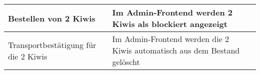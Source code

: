 \begin{table}[H]
\begin{small}
\begin{center}
\begin{tabularx}{\textwidth}{|X|X|L{1cm}|}
	Bestellen von 2 Kiwis &
	Im Admin-Frontend werden 2 Kiwis als blockiert angezeigt &
	\\ \hline
	
	Transportbestätigung für die 2 Kiwis &
	Im Admin-Frontend werden die 2 Kiwis automatisch aus dem Bestand gelöscht & 
	\\ \hline
	
	\end{tabularx}
	\label{tabl:Testprotokoll vom XX.06.2017}
	\end{center}
\end{small}
\end{table}

 
